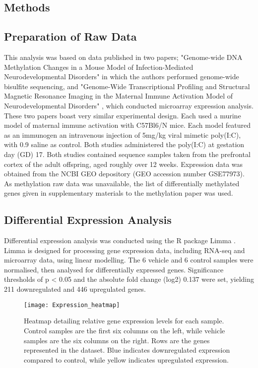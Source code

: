 \documentclass{bioinfo}
\begin{document}
\begin{methods}
\section{Methods}

\subsection{Preparation of Raw Data}
This analysis was based on data published in two papers; "Genome-wide DNA Methylation Changes in a Mouse Model of Infection-Mediated Neurodevelopmental Disorders" \citep{richetto_genome-wide_2017-1} in which the authors performed genome-wide bisulfite sequencing, and "Genome-Wide Transcriptional Profiling and Structural Magnetic Resonance Imaging in the Maternal Immune Activation Model of Neurodevelopmental Disorders" \citep{richetto_genome-wide_2017}, which conducted microarray expression analysis. These two papers boast very similar experimental design. Each used a murine model of maternal immune activation with C57Bl6/N mice. Each model featured as an immunogen an intravenous injection of 5mg/kg viral mimetic poly(I:C), with 0.9 saline as control. Both studies administered the poly(I:C) at gestation day (GD) 17. Both studies contained sequence samples taken from  the prefrontal cortex of the adult offspring, aged roughly over 12 weeks. Expression data was obtained from the NCBI GEO depository (GEO accession number GSE77973). As methylation raw data was unavailable, the list of differentially methylated genes given in supplementary materials to the methylation paper was used.

\subsection{Differential Expression Analysis}
Differential expression analysis was conducted using the R package Limma \citep{ritchie_limma_2015}. Limma is designed for processing gene expression data, including RNA-seq and microarray data, using linear modelling. The 6 vehicle and 6 control samples were normalised, then analysed for differentially expressed genes. Significance thresholds of p < 0.05 and the absolute fold change (log2) 0.137 were set, yielding 211 downregulated and 446 upregulated genes.

\begin{figure}[htbp]
\centerline{\texttt{[image: Expression\_heatmap]}}
\caption{Heatmap detailing relative gene expression levels for each sample. Control samples are the first six columns on the left, while vehicle samples are the six columns on the right. Rows are the genes represented in the dataset. Blue indicates downregulated expression compared to control, while yellow indicates upregulated expression.}\label{fig:02}
\end{figure}


\end{methods}
\end{document}
